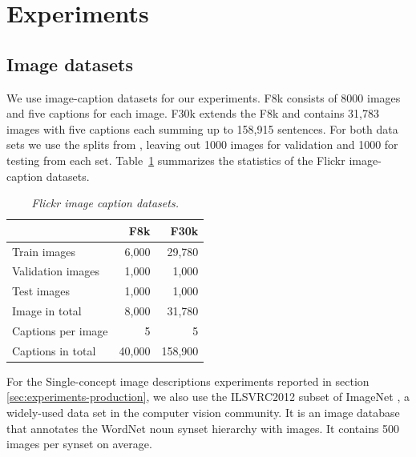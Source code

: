 \section{Experiments}
\label{sec:experiments}


\subsection{Image datasets}
\label{sec:dataset}
We use image-caption datasets for our experiments.
F8k \cite{rashtchian2010collecting} consists of 8000 images and five
captions for each image. F30k \cite{young2014image} extends the F8k and contains 31,783 images
with five captions each summing up to 158,915 sentences. For both data
sets we use the splits from \citep{karpathy2014deep}, leaving out 1000
images for validation and 1000 for testing from each
set. Table~\ref{tab:flickr} summarizes the statistics of the Flickr
image-caption datasets.



\begin{table}[h]
\centering
\begin{tabular}{l|r|r}
                    & F8k    & F30k   \\ \hline
Train images        & 6,000       & 29,780  \\
Validation images   & 1,000       & 1,000   \\
Test images         & 1,000       & 1,000   \\
Image in total      & 8,000       & 31,780  \\
Captions per image  & 5           & 5      \\
Captions in total   & 40,000      & 158,900 \\
\end{tabular}
\caption{\textit{Flickr image caption datasets.}}
\label{tab:flickr}
\end{table}
For the Single-concept image descriptions experiments reported in
section \ref{sec:experiments-production}, we also use the ILSVRC2012
subset of ImageNet \cite{ILSVRCarxiv14}, a widely-used data set in the computer vision
community. It is an image database that annotates the WordNet noun
synset hierarchy with images. It contains 500 images per synset on
average.

